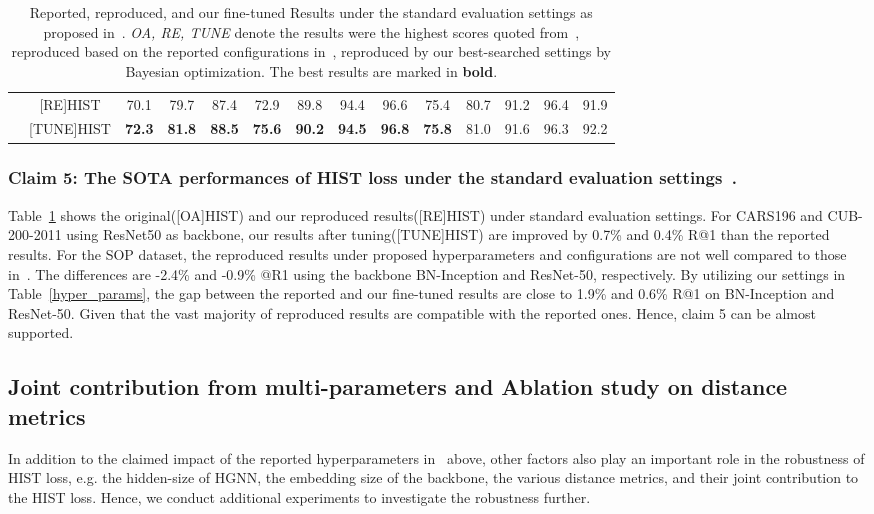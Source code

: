 \begin{table}[ht!]
\begin{tabular}{cccccccccccccc}
                              & {[}RE{]}HIST            & 70.1          & 79.7          & 87.4          & 72.9          & 89.8          & 94.4          & 96.6          & 75.4          & 80.7          & 91.2          & 96.4          & 91.9          \\
                              & {[}TUNE{]}HIST          & \textbf{72.3} & \textbf{81.8} & \textbf{88.5} & \textbf{75.6} & \textbf{90.2} & \textbf{94.5} & \textbf{96.8} & \textbf{75.8} & 81.0          & 91.6          & 96.3          & 92.2          \\ 
\bottomrule[0.8pt]
\end{tabular}
\caption{Reported, reproduced, and our fine-tuned Results under the standard evaluation settings as proposed in~\cite{lim2022hypergraph}. \textit{OA, RE, TUNE} denote the results were the highest scores quoted from~\cite{lim2022hypergraph}, reproduced based on the reported configurations in~\cite{lim2022hypergraph}, reproduced by our best-searched settings by Bayesian optimization. The best results are marked in \textbf{bold}.}
\label{result_origin_paper}
\end{table}

\subsubsection{Claim 5: The SOTA performances of HIST loss under the standard evaluation settings~\cite{kim2020proxy,oh2016deep,qian2019softtriple, wang2019multi}.}
Table~\ref{result_origin_paper} shows the original([OA]HIST) and our reproduced results([RE]HIST) under standard evaluation settings. For CARS196 and CUB-200-2011 using ResNet50 as backbone, our results after tuning([TUNE]HIST) are improved by 0.7\% and 0.4\% R@1 than the reported results. For the SOP dataset, the reproduced results under proposed hyperparameters and configurations are not well compared to those in~\cite{lim2022hypergraph}. The differences are -2.4\% and -0.9\% @R1 using the backbone BN-Inception and ResNet-50, respectively. By utilizing our settings in Table~\ref{hyper_params}, the gap between the reported and our fine-tuned results are close to 1.9\% and 0.6\% R@1 on BN-Inception and ResNet-50. Given that the vast majority of reproduced results are compatible with the reported ones. Hence, claim 5 can be almost supported.

\subsection{Joint contribution from multi-parameters and Ablation study on distance metrics}
In addition to the claimed impact of the reported hyperparameters in~\cite{lim2022hypergraph} above, other factors also play an important role in the robustness of HIST loss, e.g. the hidden-size of HGNN, the embedding size of the backbone, the various distance metrics, and their joint contribution to the HIST loss. Hence, we conduct additional experiments to investigate the robustness further.

